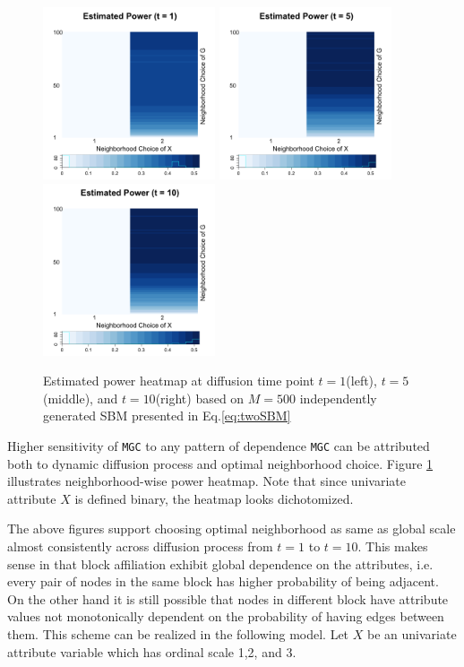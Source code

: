\documentclass[12pt]{article}
\theoremstyle{definition}
\begin{document}
\begin{figure}[H]
	\centering
	\label{fig:twoSBM_power}
	\includegraphics[width=2in]{../Figure/twoSBM_power1.png}
	\includegraphics[width=2in]{../Figure/twoSBM_power5.png}
	\includegraphics[width=2in]{../Figure/twoSBM_power10.png}
	\caption{Estimated power heatmap at diffusion time point $t=1$(left), $t=5$(middle), and $t=10$(right) based on $M = 500$ independently generated SBM presented in Eq.\ref{eq:twoSBM}}
\end{figure}

Higher sensitivity of \texttt{MGC} to any pattern of dependence \texttt{MGC} can be attributed both to dynamic diffusion process and optimal neighborhood choice. Figure \ref{fig:twoSBM_power} illustrates neighborhood-wise power heatmap. Note that since univariate attribute $X$ is defined binary, the heatmap looks dichotomized.

The above figures support choosing optimal neighborhood as same as global scale almost consistently across diffusion process from $t=1$ to $t=10$. This makes sense in that block affiliation exhibit global dependence on the attributes, i.e. every pair of nodes in the same block has higher probability of being adjacent. On the other hand it is still possible that nodes in different block have attribute values not monotonically dependent on the probability of having edges between them. This scheme can be realized in the following model. Let $X$ be an univariate attribute variable which has ordinal scale 1,2, and 3. 
\end{document}
